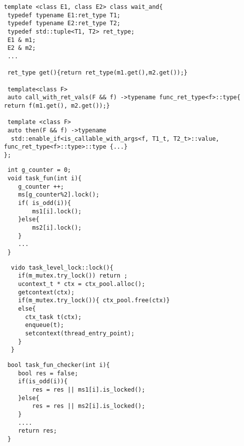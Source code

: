 \newsavebox{\waitandthen}
\begin{lrbox}{\waitandthen}
  \begin{lstlisting}[mathescape]
template <class E1, class E2> class wait_and{
 typedef typename E1:ret_type T1;
 typedef typename E2:ret_type T2;
 typedef std::tuple<T1, T2> ret_type;
 E1 & m1;
 E2 & m2;
 ...

 ret_type get(){return ret_type(m1.get(),m2.get());}

 template<class F>
 auto call_with_ret_vals(F && f) ->typename func_ret_type<f>::type{ return f(m1.get(), m2.get());}

 template <class F>
 auto then(F && f) ->typename
  std::enable_if<is_callable_with_args<f, T1_t, T2_t>::value, func_ret_type<f>::type>::type {...}
};
  \end{lstlisting}
\end{lrbox}


\newsavebox{\tasklisting}
\begin{lrbox}{\tasklisting}%
\begin{lstlisting}
 int g_counter = 0;
 void task_fun(int i){
    g_counter ++;
    ms[g_counter%2].lock();
    if( is_odd(i)){
        ms1[i].lock();
    }else{
        ms2[i].lock();
    }
    ...
 }
\end{lstlisting}
\end{lrbox}

\newsavebox{\tasklocklisting}
\begin{lrbox}{\tasklocklisting}
\begin{lstlisting}
  vido task_level_lock::lock(){
    if(m_mutex.try_lock()) return ;
    ucontext_t * ctx = ctx_pool.alloc();
    getcontext(ctx);
    if(m_mutex.try_lock()){ ctx_pool.free(ctx)}
    else{
      ctx_task t(ctx);
      enqueue(t);
      setcontext(thread_entry_point);
    }
  }
\end{lstlisting}
\end{lrbox}

\newsavebox{\checkerlisting}
\begin{lrbox}{\checkerlisting}%
\begin{lstlisting}
 bool task_fun_checker(int i){
    bool res = false;
    if(is_odd(i)){
        res = res || ms1[i].is_locked();
    }else{
        res = res || ms2[i].is_locked();
    }
    ....
    return res;
 }
\end{lstlisting}
\end{lrbox}

